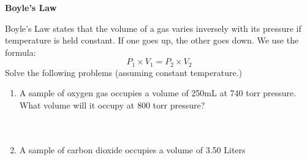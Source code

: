 \documentclass[11pt]{article}
\begin{document}
\begin{center}
	\textbf{Boyle's Law}
\end{center}
	Boyle's Law states that the volume of a gas varies inversely with its pressure
	if temperature is held constant.  If one goes up, the other goes down.  We use
	the formula:\[
		P_{1} \times V_{1} = P_{2} \times V_{2} 
	\]
	Solve the following problems (assuming constant temperature.)
	\begin{enumerate}
		\item A sample of oxygen gas occupies a volume of 250mL at 740 torr pressure.
			What volume will it occupy at 800 torr pressure? \\ \\ \\
		\item A sample of carbon dioxide occupies a volume of 3.50 Liters 
	\end{enumerate}
\end{document}
